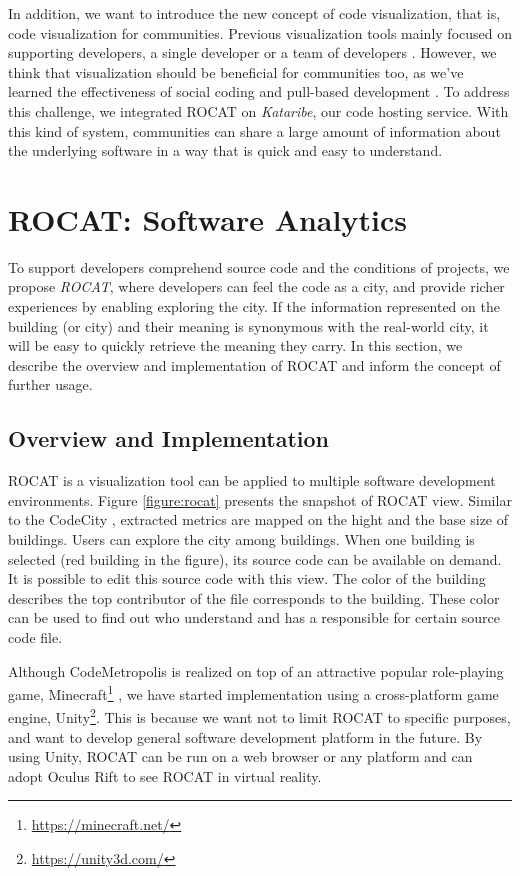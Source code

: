 \documentclass[conference]{IEEEtran}
\newcommand{\figref}[1]{Figure \ref{#1}}
\begin{document}
In addition, we want to introduce the new concept of code visualization, that is, code visualization for communities.
Previous visualization tools mainly focused on supporting developers, a single developer \cite{Wettel:2011:SSC:1985793.1985868} or a team of developers \cite{6648194}.
However, we think that visualization should be beneficial for communities too, as we've learned the effectiveness of social coding \cite{Dabbish:2012:SCG:2145204.2145396} and pull-based development \cite{Gousios:2014:ESP:2568225.2568260}.
To address this challenge, we integrated ROCAT on \textit{Kataribe},  our code hosting service.
With this kind of system, communities can share a large amount of information about the underlying software in a way that is quick and easy to understand.

\section{ROCAT: Software Analytics}
To support developers comprehend source code and the conditions of projects, we propose \textit{ROCAT}, where developers can feel the code as a city, and provide richer experiences by enabling exploring the city.
If the information represented on the building (or city) and their meaning is synonymous with the real-world city, it will be easy to quickly retrieve the meaning they carry.
In this section, we describe the overview and implementation of ROCAT and inform the concept of further usage.

\subsection{Overview and Implementation}
ROCAT is a visualization tool can be applied to multiple software development environments.
\figref{figure:rocat} presents the snapshot of ROCAT view.
Similar to the CodeCity \cite{Wettel:2011:SSC:1985793.1985868}, extracted metrics are mapped on the hight and the base size of buildings.
Users can explore the city among buildings.
When one building is selected (red building in the figure), its source code can be available on demand.
It is possible to edit this source code with this view.
The color of the building describes the top contributor of the file corresponds to the building.
These color can be used to find out who understand and has a responsible for certain source code file.

Although CodeMetropolis is realized on top of an attractive popular role-playing game, Minecraft\footnote{\url{https://minecraft.net/}} \cite{6648194}, we have started implementation using a cross-platform game engine, Unity\footnote{\url{https://unity3d.com/}}.
This is because we want not to limit ROCAT to specific purposes, and want to develop general software development platform in the future.
By using Unity, ROCAT can be run on a web browser or any platform and can adopt Oculus Rift to see ROCAT in virtual reality.
\end{document}
